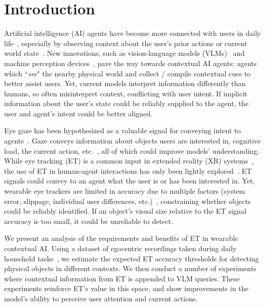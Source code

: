 \section{Introduction}

Artificial intelligence (AI) agents have become more connected with users in daily life~\cite{wienrich_extended_2021}, especially by observing context about the user's prior actions or current world state~\cite{zhang_vision_survey_2024}.  New innovations, such as vision-language models (VLMs)~\cite{li_foundation_2024} and machine perception devices~\cite{engel_aria_2023}, pave the way towards contextual AI agents: agents which ``\textit{see}" the nearby physical world and collect / compile contextual cues to better assist users.  Yet, current models interpret information differently than humans, so often misinterpret context, conflicting with user intent.  If implicit information about the user's state could be reliably supplied to the agent, the user and agent's intent could be better aligned.

Eye gaze has been hypothesized as a valuable signal for conveying intent to agents~\cite{ajanki_contextual_2010, buschel_here_2018, burlingham_scanpaths_2024, zhang_agi_2024}.  Gaze conveys information about objects users are interested in, cognitive load, the current action, etc.~\cite{mahanama2022eye}, all of which could improve models' understanding.  While eye tracking (ET) is a common input in extended reality (XR) systems~\cite{plopski_survey_2022}, the use of ET in human-agent interactions has only been lightly explored~\cite{sendhilnathan2024implicitgazeresearchxr}.  ET signals could convey to an agent what the user is or has been interested in.  Yet, wearable eye trackers are limited in accuracy due to multiple factors (system error, slippage, individual user differences, etc.)~\cite{ehinger2019new}, constraining whether objects could be reliably identified.  If an object's visual size relative to the ET signal accuracy is too small, it could be unreliable to detect.  

We present an analysis of the requirements and benefits of ET in wearable contextual AI.  Using a dataset of egocentric recordings taken during daily household tasks~\cite{pan_adt_2023}, we estimate the expected ET accuracy thresholds for detecting physical objects in different contexts.  We then conduct a number of experiments where contextual information from ET is appended to VLM queries.  These experiments reinforce ET's value in this space, and show improvements in the model's ability to perceive user attention and current actions.

